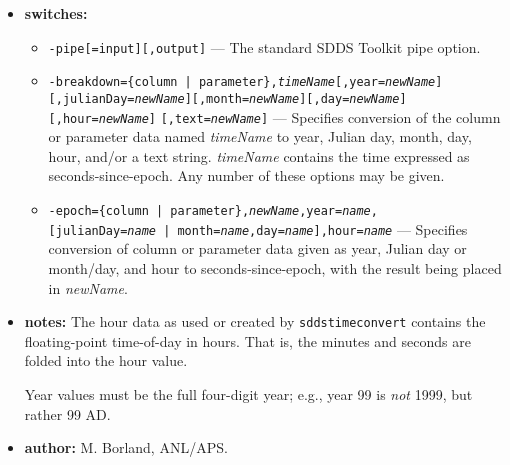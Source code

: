 \begin{itemize}
\item {\bf switches:} 
    \begin{itemize} 
    \item {\tt -pipe[=input][,output]} --- The standard SDDS Toolkit pipe option. 
    \item {\tt -breakdown=\{column | parameter\},{\em timeName}[,year={\em newName}]}
        {\tt [,julianDay={\em newName}][,month={\em newName}][,day={\em newName}][,hour={\em newName}]}
        {\tt [,text={\em newName}]} ---  
        Specifies conversion of the column or parameter data named
        {\em timeName} to year, Julian day, month, day, hour, and/or a text string.  
        {\em timeName} contains the time expressed as
        seconds-since-epoch.  Any number of these options may be given. 
    \item {\tt -epoch=\{column | parameter\},{\em newName},year={\em name},}\\ {\tt [julianDay={\em name} | month={\em name},day={\em name}],hour={\em name}} ---  
        Specifies conversion of column or parameter data given as year, Julian day or month/day, and hour
to seconds-since-epoch, with the result being placed in {\em newName}.  
    \end{itemize} 

\item {\bf notes:}
The hour data as used or created by \verb|sddstimeconvert| contains the floating-point time-of-day in hours.
That is, the minutes and seconds are folded into the hour value.

Year values must be the full four-digit year; e.g., year 99 is {\em not} 1999, but rather 99 AD.

\item {\bf author:} M. Borland, ANL/APS. 
\end{itemize} 
